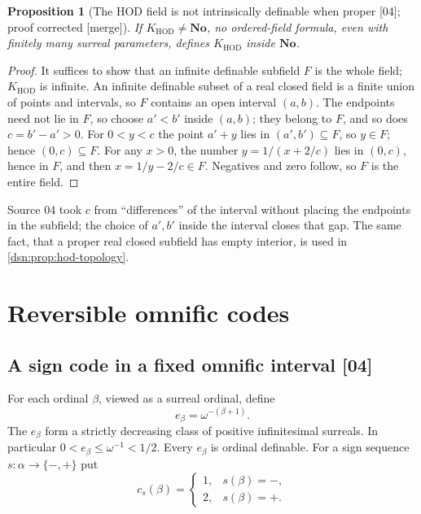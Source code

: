 \documentclass[11pt,a4paper]{article}
\numberwithin{equation}{section}
\newtheorem{proposition}[proposition]{Proposition}
\theoremstyle{definition}
\theoremstyle{remark}
\newcommand{\No}{\mathbf{No}}
\newcommand{\HOD}{\mathrm{HOD}}
\newcommand{\KH}{K_{\HOD}}
\newcommand{\src}[1]{\textup{\textsf{\small[#1]}}}
\newcommand{\mergetag}{\textup{\textsf{\small[merge]}}}
\begin{document}
\begin{proposition}[The HOD field is not intrinsically definable when proper \src{04}; proof corrected \mergetag]
\label{dsn:prop:notdefinable}
If $\KH\ne\No$, no ordered-field formula, even with finitely many
surreal parameters, defines $\KH$ inside $\No$.
\end{proposition}
\begin{proof}
It suffices to show that an infinite definable subfield $F$ is the whole
field; $\KH$ is infinite. An infinite definable subset of a real closed
field is a finite union of points and intervals, so $F$ contains an open
interval $(a,b)$. The endpoints need not lie in $F$, so choose
$a'<b'$ inside $(a,b)$; they belong to $F$, and so does $c=b'-a'>0$. For
$0<y<c$ the point $a'+y$ lies in $(a',b')\subseteq F$, so $y\in F$; hence
$(0,c)\subseteq F$. For any $x>0$, the number $y=1/(x+2/c)$ lies in
$(0,c)$, hence in $F$, and then $x=1/y-2/c\in F$. Negatives and zero
follow, so $F$ is the entire field.
\end{proof}

Source 04 took $c$ from ``differences'' of the interval without placing
the endpoints in the subfield; the choice of $a',b'$ inside the interval
closes that gap. The same fact, that a proper real closed subfield has
empty interior, is used in \cref{dsn:prop:hod-topology}.

\section{Reversible omnific codes}
\label{dsn:sec:code}

\subsection{A sign code in a fixed omnific interval \src{04}}

For each ordinal $\beta$, viewed as a surreal ordinal, define
\begin{equation}\label{dsn:eq:eps}
 e_\beta=\omega^{-(\beta+1)}.
\end{equation}
The $e_\beta$ form a strictly decreasing class of positive infinitesimal
surreals. In particular $0<e_\beta\leq\omega^{-1}<1/2$.
Every $e_\beta$ is ordinal definable. For a sign sequence
$s:\alpha\to\{-,+\}$ put
\[
 c_s(\beta)=\begin{cases}1,&s(\beta)=-,\\2,&s(\beta)=+.\end{cases}
\]
\end{document}
